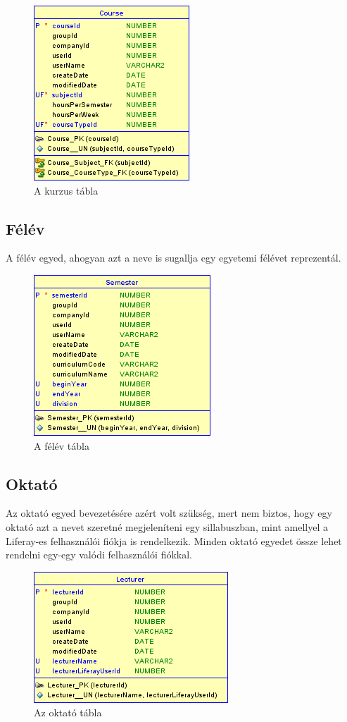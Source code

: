 \documentclass[hidelinks, 12pt, a4paper]{report}
\begin{document}
\begin{figure}[H]
    \centering
	\includegraphics{course.png}
	\caption{A kurzus tábla}
\end{figure}

\subsection{Félév}

A félév egyed, ahogyan azt a neve is sugallja egy egyetemi félévet reprezentál.

\begin{figure}[H]
    \centering
	\includegraphics{semester.png}
	\caption{A félév tábla}
\end{figure}

\subsection{Oktató}

Az oktató egyed bevezetésére azért volt szükség, mert nem biztos, hogy egy oktató azt a nevet szeretné megjeleníteni egy sillabuszban, mint amellyel a Liferay-es felhasználói fiókja is rendelkezik. Minden oktató egyedet össze lehet rendelni egy-egy valódi felhasználói fiókkal.

\begin{figure}[H]
    \centering
	\includegraphics{lecturer.png}
	\caption{Az oktató tábla}
\end{figure}
\end{document}
